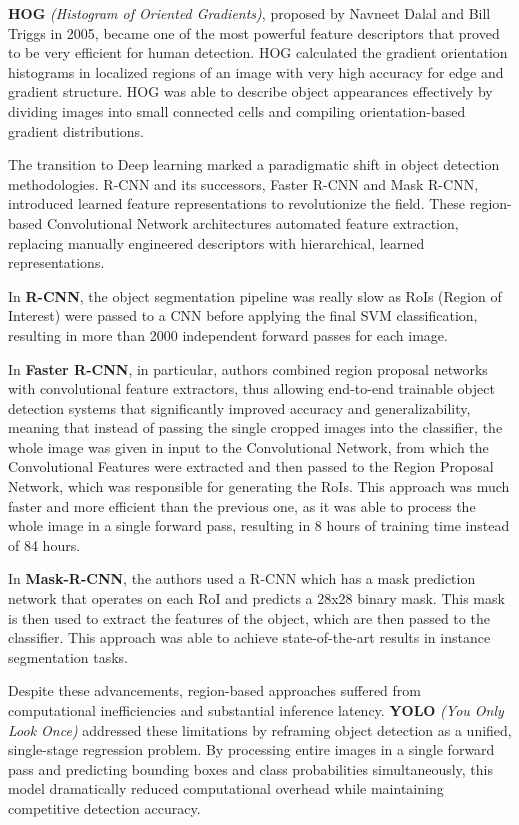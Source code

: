 \textbf{HOG} \textit{(Histogram of Oriented Gradients)}, proposed by Navneet Dalal and Bill Triggs in 2005, became one of the most powerful feature descriptors that proved to be very efficient for human detection. HOG calculated the gradient orientation histograms in localized regions of an image with very high accuracy for edge and gradient structure. HOG was able to describe object appearances effectively by dividing images into small connected cells and compiling orientation-based gradient distributions.

The transition to Deep learning marked a paradigmatic shift in object detection methodologies. R-CNN and its successors, Faster R-CNN and Mask R-CNN, introduced learned feature representations to revolutionize the field. These region-based Convolutional Network architectures automated feature extraction, replacing manually engineered descriptors with hierarchical, learned representations.

In \textbf{R-CNN}, the object segmentation pipeline was really slow as RoIs (Region of Interest) were passed to a CNN before applying the final SVM classification, resulting in more than 2000 independent forward passes for each image.

In \textbf{Faster R-CNN}, in particular, authors combined region proposal networks with convolutional feature extractors, thus allowing end-to-end trainable object detection systems that significantly improved accuracy and generalizability, meaning that instead of passing the single cropped images into the classifier, the whole image was given in input to the Convolutional Network, from which the Convolutional Features were extracted and then passed to the Region Proposal Network, which was responsible for generating the RoIs. This approach was much faster and more efficient than the previous one, as it was able to process the whole image in a single forward pass, resulting in 8 hours of training time instead of 84 hours.

In \textbf{Mask-R-CNN}, the authors used a R-CNN which has a mask prediction network that operates on each RoI and predicts a 28x28 binary mask. This mask is then used to extract the features of the object, which are then passed to the classifier. This approach was able to achieve state-of-the-art results in instance segmentation tasks.

Despite these advancements, region-based approaches suffered from computational inefficiencies and substantial inference latency. \textbf{YOLO} \textit{(You Only Look Once)} \cite{YOLO} addressed these limitations by reframing object detection as a unified, single-stage regression problem. By processing entire images in a single forward pass and predicting bounding boxes and class probabilities simultaneously, this model dramatically reduced computational overhead while maintaining competitive detection accuracy.

